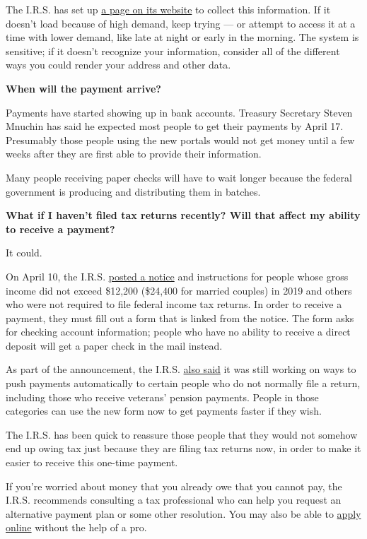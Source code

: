The I.R.S. has set up
\href{https://www.irs.gov/coronavirus/get-my-payment}{a page on its
website} to collect this information. If it doesn't load because of high
demand, keep trying --- or attempt to access it at a time with lower
demand, like late at night or early in the morning. The system is
sensitive; if it doesn't recognize your information, consider all of the
different ways you could render your address and other data.

\textbf{When will the payment arrive?}

Payments have started showing up in bank accounts. Treasury Secretary
Steven Mnuchin has said he expected most people to get their payments by
April 17. Presumably those people using the new portals would not get
money until a few weeks after they are first able to provide their
information.

Many people receiving paper checks will have to wait longer because the
federal government is producing and distributing them in batches.

\textbf{What if I haven't filed tax returns recently? Will that affect
my ability to receive a payment?}

It could.

On April 10, the I.R.S.
\href{https://www.irs.gov/coronavirus/non-filers-enter-payment-info-here}{posted
a notice} and instructions for people whose gross income did not exceed
\$12,200 (\$24,400 for married couples) in 2019 and others who were not
required to file federal income tax returns. In order to receive a
payment, they must fill out a form that is linked from the notice. The
form asks for checking account information; people who have no ability
to receive a direct deposit will get a paper check in the mail instead.

As part of the announcement, the I.R.S.
\href{https://www.irs.gov/newsroom/treasury-irs-launch-new-tool-to-help-non-filers-register-for-economic-impact-payments}{also
said} it was still working on ways to push payments automatically to
certain people who do not normally file a return, including those who
receive veterans' pension payments. People in those categories can use
the new form now to get payments faster if they wish.

The I.R.S. has been quick to reassure those people that they would not
somehow end up owing tax just because they are filing tax returns now,
in order to make it easier to receive this one-time payment.

If you're worried about money that you already owe that you cannot pay,
the I.R.S. recommends consulting a tax professional who can help you
request an alternative payment plan or some other resolution. You may
also be able to
\href{https://www.irs.gov/payments/payment-plans-installment-agreements\#eligibility}{apply
online} without the help of a pro.

